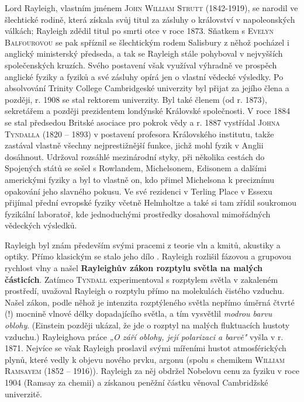         \begin{tcnote}
          Lord Rayleigh, vlastním jménem \textsc{John William Strutt} (1842-1919), se narodil ve
          šlechtické rodině, která získala svůj titul za zásluhy o království v napoleonských
          válkách; Rayleigh zdědil titul po smrti otce v roce 1873. Sňatkem s \textsc{Evelyn
          Balfourovou} se pak spříznil se šlechtickým rodem Salisbury z něhož pocházel i anglický
          ministerský předseda, a tak se Rayleigh stále pohyboval v nejvyšších společenských
          kruzích. Svého postavení však využíval výhradně ve prospěch anglické fyziky a fyziků a své
          zásluhy opírá jen o vlastní vědecké výsledky. Po absolvování Trinity College Cambridgeské
          univerzity byl přijat za jejího člena a později, r. 1908 se stal rektorem univerzity. Byl
          také členem (od r. 1873), sekretářem a později prezidentem londýnské Královské
          společnosti. V roce 1884 se stal předsedou Britské asociace pro pokrok vědy a r. 1887
          vystřídal \textsc{Johna Tyndalla} (1820 – 1893) v postavení profesora Královského
          institutu, takže zastával vlastně všechny nejprestižnější funkce, jichž mohl fyzik v
          Anglii dosáhnout. Udržoval rozsáhlé mezinárodní styky, při několika cestách do Spojených
          států se sešel s Rowlandem, Michelsonem, Edisonem a dalšími americkými fyziky a byl to
          vlastně on, kdo přimel Michelsona k preciznímu opakování jeho slavného pokusu. Ve své
          rezidenci v Terling Place v Essexu přijímal přední evropské fyziky včetně Helmholtze a
          také si tam zřídil soukromou fyzikální laboratoř, kde jednoduchými prostředky dosahoval
          mimořádných vědeckých výsledků.
        \end{tcnote}
        
        Rayleigh byl znám především svými pracemi z teorie vln a kmitů, akustiky a optiky. Přímo
        klasickým se stalo jeho dílo \emph{}. Rayleigh rozlišil fázovou a grupovou
        rychlost vlny a našel \textbf{Rayleighův zákon rozptylu světla na malých částicích}. Zatímco
        \textsc{Tyndall} experimentoval s rozptylem světla v zakaleném prostředí, uvažoval Rayleigh
        o rozptylu přímo na molekulách čistého vzduchu. Našel zákon, podle něhož je intenzita
        rozptýleného světla nepřímo úměrná čtvrté (!) mocnině vlnové délky dopadajícího světla, a
        tím vysvětlil \emph{modrou barvu oblohy}. (Einstein později ukázal, že jde o rozptyl na
        malých fluktuacích hustoty vzduchu.) Rayleighova práce \emph{„O září oblohy, její polarizaci
        a barvě"} vyšla v r. 1871. Nejvíce se však Rayleigh proslavil svými mířeními hustot
        atmosférických plynů, které vedly k objevu nového prvku, argonu (spolu s chemikem
        \textsc{William Ramsayem} (1852 – 1916)). Rayleigh za něj obdržel Nobelovu cenu za fyziku v
        roce 1904 (Ramsay za chemii) a získanou peněžní částku věnoval Cambridžské univerzitě.

